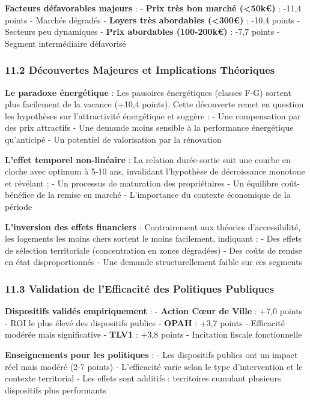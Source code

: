 \documentclass[11pt]{article}
\begin{document}
\textbf{Facteurs défavorables majeurs} : - \textbf{Prix très bon marché
(\textless50k€)} : -11,4 points - Marchés dégradés - \textbf{Loyers très
abordables (\textless300€)} : -10,4 points - Secteurs peu dynamiques -
\textbf{Prix abordables (100-200k€)} : -7,7 points - Segment
intermédiaire défavorisé

\subsubsection{11.2 Découvertes Majeures et Implications
Théoriques}\label{duxe9couvertes-majeures-et-implications-thuxe9oriques}

\textbf{Le paradoxe énergétique} : Les passoires énergétiques (classes
F-G) sortent plus facilement de la vacance (+10,4 points). Cette
découverte remet en question les hypothèses sur l'attractivité
énergétique et suggère : - Une compensation par des prix attractifs -
Une demande moins sensible à la performance énergétique qu'anticipé - Un
potentiel de valorisation par la rénovation

\textbf{L'effet temporel non-linéaire} : La relation durée-sortie suit
une courbe en cloche avec optimum à 5-10 ans, invalidant l'hypothèse de
décroissance monotone et révélant : - Un processus de maturation des
propriétaires - Un équilibre coût-bénéfice de la remise en marché -
L'importance du contexte économique de la période

\textbf{L'inversion des effets financiers} : Contrairement aux théories
d'accessibilité, les logements les moins chers sortent le moins
facilement, indiquant : - Des effets de sélection territoriale
(concentration en zones dégradées) - Des coûts de remise en état
disproportionnés - Une demande structurellement faible sur ces segments

\subsubsection{11.3 Validation de l'Efficacité des Politiques
Publiques}\label{validation-de-lefficacituxe9-des-politiques-publiques}

\textbf{Dispositifs validés empiriquement} : - \textbf{Action Cœur de
Ville} : +7,0 points - ROI le plus élevé des dispositifs publics -
\textbf{OPAH} : +3,7 points - Efficacité modérée mais significative -
\textbf{TLV1} : +3,8 points - Incitation fiscale fonctionnelle

\textbf{Enseignements pour les politiques} : - Les dispositifs publics
ont un impact réel mais modéré (2-7 points) - L'efficacité varie selon
le type d'intervention et le contexte territorial - Les effets sont
additifs : territoires cumulant plusieurs dispositifs plus performants
\end{document}
